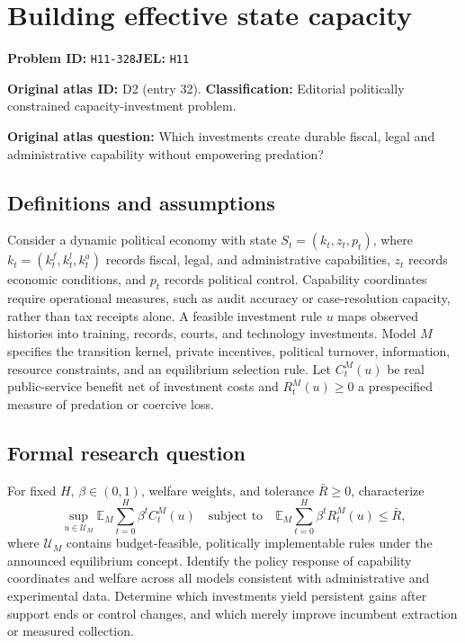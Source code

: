 \documentclass[11pt,a4paper]{article}
\begin{document}
\section*{Building effective state capacity}
\textbf{Problem ID:} \texttt{H11-328}\quad \textbf{JEL:} \texttt{H11}\par
\label{problem:OP-0032}
\label{atlas:prob:D2}
\noindent\textbf{Original atlas ID:} D2 (entry 32). \textbf{Classification:} Editorial politically constrained capacity-investment problem.

\noindent\textbf{Original atlas question:} Which investments create durable fiscal, legal and administrative capability without empowering predation?

\subsection*{Definitions and assumptions}
Consider a dynamic political economy with state $S_t=(k_t,z_t,p_t)$, where $k_t=(k_t^f,k_t^l,k_t^a)$ records fiscal, legal, and administrative capabilities, $z_t$ records economic conditions, and $p_t$ records political control. Capability coordinates require operational measures, such as audit accuracy or case-resolution capacity, rather than tax receipts alone. A feasible investment rule $u$ maps observed histories into training, records, courts, and technology investments. Model $M$ specifies the transition kernel, private incentives, political turnover, information, resource constraints, and an equilibrium selection rule. Let $C_t^M(u)$ be real public-service benefit net of investment costs and $R_t^M(u)\geq0$ a prespecified measure of predation or coercive loss.
\subsection*{Formal research question}
For fixed $H$, $\beta\in(0,1)$, welfare weights, and tolerance $\bar R\geq0$, characterize
\[
 \sup_{u\in\mathcal U_M}
     \mathbb E_M\sum_{t=0}^H\beta^t C_t^M(u)
 \quad\text{subject to}\quad
     \mathbb E_M\sum_{t=0}^H\beta^t R_t^M(u)\leq\bar R,
\]
where $\mathcal U_M$ contains budget-feasible, politically implementable rules under the announced equilibrium concept. Identify the policy response of capability coordinates and welfare across all models consistent with administrative and experimental data. Determine which investments yield persistent gains after support ends or control changes, and which merely improve incumbent extraction or measured collection.
\end{document}
